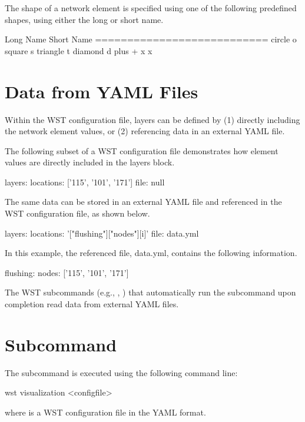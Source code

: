 The shape of a network element is specified using one of the following predefined shapes, using 
either the long or short name.
\begin{unknownListing}
  Long Name    Short Name   
===========================
  circle        o
  square        s
  triangle      t
  diamond       d
  plus          +
  x		x
\end{unknownListing}

\section{Data from YAML Files}
Within the  WST configuration file, layers can be 
defined by 
(1) directly including the network element values, or
(2) referencing data in an external YAML file.

The following subset of a  WST configuration file 
demonstrates how element values are directly included in the layers block. 
\begin{unknownListing}
layers:
  locations: ['115', '101', '171']   
  file: null
\end{unknownListing}

The same data can be stored in an external YAML file and referenced in the 
 WST configuration file, as shown below. 
\begin{unknownListing}
layers:
  locations: '["flushing"]["nodes"][i]'
  file: data.yml
\end{unknownListing}
In this example, the referenced file, data.yml, contains the following information. 
\begin{unknownListing}
flushing:
  nodes: ['115', '101', '171']   
\end{unknownListing}

The WST subcommands (e.g., , ) that 
automatically run the  subcommand 
upon completion read data from external YAML files.

\section{ Subcommand}

The  subcommand is executed using the following command line:
\begin{unknownListing}
wst visualization <configfile> 
\end{unknownListing}
where  is a WST configuration file in the YAML format.  

